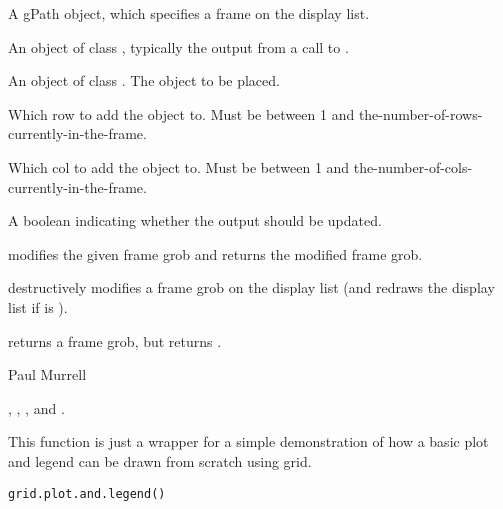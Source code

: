 \begin{Arguments}
\begin{ldescription}
\item[\code{gPath}]  A gPath object, which specifies a frame on the
display list.
\item[\code{frame}]  An object of class , typically the output
from a call to . 
\item[\code{grob}]  An object of class .  The object to be
placed. 
\item[\code{row}]  Which row to add the object to.  Must be between 1 and
the-number-of-rows-currently-in-the-frame. 
\item[\code{col}]  Which col to add the object to.  Must be between 1 and
the-number-of-cols-currently-in-the-frame.  
\item[\code{redraw}]  A boolean indicating whether the output should be updated. 
\end{ldescription}
\end{Arguments}
%
\begin{Details}\relax
{} modifies the given frame grob and returns the modified
frame grob.

 destructively modifies a frame grob on the display
list (and redraws the display list if  is ).

\end{Details}
%
\begin{Value}
 returns a frame grob, but  returns
.
\end{Value}
%
\begin{Author}\relax
 Paul Murrell 
\end{Author}
%
\begin{SeeAlso}\relax
{},
,
, and .
\end{SeeAlso}
%
\begin{Description}\relax
This function is just a wrapper for a simple demonstration of how
a basic plot and legend can be drawn from scratch using grid.
\end{Description}
%
\begin{Usage}
\begin{verbatim}
grid.plot.and.legend()
\end{verbatim}
\end{Usage}
